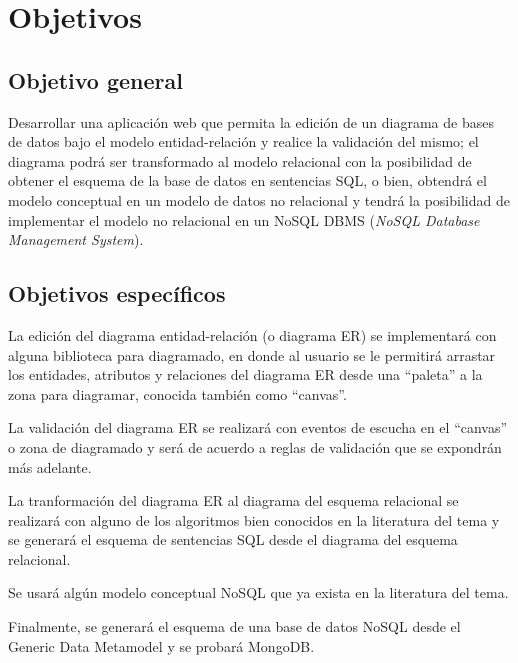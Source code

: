 \section{Objetivos}

\subsection*{Objetivo general}
Desarrollar una aplicación web que permita la edición de un diagrama de bases de datos bajo el modelo entidad-relación y realice la validación del mismo; el diagrama podrá ser transformado al modelo relacional con la posibilidad de obtener el esquema de la base de datos en sentencias SQL, o bien, obtendrá el modelo conceptual en un modelo de datos no relacional y tendrá la posibilidad de implementar el modelo no relacional en un NoSQL DBMS (\textit{NoSQL Database Management System}).

\subsection*{Objetivos específicos}

La edición del diagrama entidad-relación (o diagrama ER) se implementará con alguna biblioteca para diagramado, en donde al usuario se le permitirá arrastar los entidades, atributos y relaciones del diagrama ER desde una ``paleta''  a la zona para diagramar, conocida también como ``canvas''.


La validación del diagrama ER se realizará con eventos de escucha en el ``canvas'' o zona de diagramado y será de acuerdo a reglas de validación que se expondrán más adelante.


La tranformación del diagrama ER al diagrama del esquema relacional se realizará con alguno de los algoritmos bien conocidos en la literatura del tema y se generará el esquema de sentencias SQL desde el diagrama del esquema relacional.


Se usará algún modelo conceptual NoSQL que ya exista en la literatura del tema.


Finalmente, se generará el esquema de una base de datos NoSQL desde el Generic Data Metamodel y se probará MongoDB.
